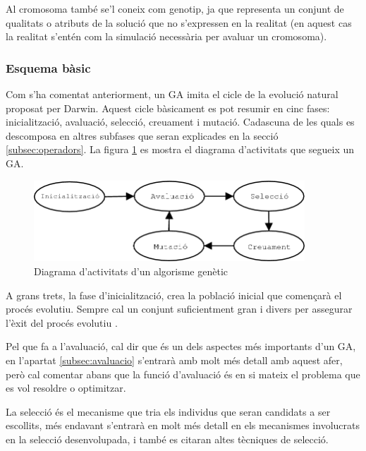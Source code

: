 Al cromosoma també se'l coneix com genotip, ja que representa un conjunt de
qualitats o atributs de la solució que no s'expressen en la realitat (en aquest
cas la realitat s'entén com la simulació necessària per avaluar un cromosoma).



\subsubsection{Esquema bàsic}

Com s'ha comentat anteriorment, un GA imita el cicle de la evolució natural
proposat per Darwin. Aquest cicle bàsicament es pot resumir en cinc fases:
inicialització, avaluació, selecció, creuament i mutació. Cadascuna de les quals
es descomposa en altres subfases que seran explicades en la secció
\ref{subsec:operadors}. La figura \ref{fig:ga} es mostra el diagrama
d'activitats que segueix un GA.

\begin{figure} \centering \includegraphics[width=4in]{intro/ga}
\caption{\label{fig:ga}Diagrama d'activitats d'un algorisme genètic}
\end{figure}

A grans trets, la fase d'inicialització, crea la població inicial que començarà
el procés evolutiu. Sempre cal un conjunt suficientment gran i divers per
assegurar l'èxit del procés evolutiu \cite{G02}.

Pel que fa a l'avaluació, cal dir que és un dels aspectes més importants d'un
GA, en l'apartat \ref{subsec:avaluacio} s'entrarà amb molt més detall amb aquest
afer, però cal comentar abans que la funció d'avaluació és en si mateix el
problema que es vol resoldre o optimitzar.

La selecció és el mecanisme que tria els individus que seran candidats a ser
escollits, més endavant s'entrarà en molt més detall en els mecanismes
involucrats en la selecció desenvolupada, i també es citaran altes tècniques de
selecció.

